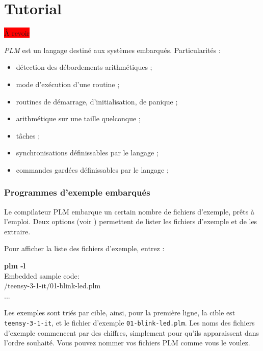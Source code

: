 

\chapter{Tutorial}

\thispagestyle{empty}

\colorbox{red}{À revoir}


\emph{PLM} est un langage destiné aux systèmes embarqués. Particularités :
\begin{itemize}
  \item détection des débordements arithmétiques ;
  \item mode d'exécution d'une routine ;
  \item routines de démarrage, d'initialisation, de panique ;
  \item arithmétique sur une taille quelconque ;
  \item tâches ;
  \item synchronisations définissables par le langage ;
  \item commandes gardées définissables par le langage ;
\end{itemize}



\subsection{Programmes d'exemple embarqués}

Le compilateur PLM embarque un certain nombre de fichiers d'exemple, prêts à l'emploi. Deux options (voir ) permettent de lister les fichiers d'exemple et de les extraire.

Pour afficher la liste des fichiers d'exemple, entrez :

\begin{SHELL}
{\bfseries plm -l}\\
Embedded sample code:\\ 
\hspace*{1.2em}/teensy-3-1-it/01-blink-led.plm\\
\hspace*{1.2em}...
\end{SHELL}

Les exemples sont triés par cible, ainsi, pour la première ligne, la cible est \texttt{teensy-3-1-it}, et le fichier d'exemple \texttt{01-blink-led.plm}. Les noms des fichiers d'exemple commencent par des chiffres, simplement pour qu'ils apparaissent dans l'ordre souhaité. Vous pouvez nommer vos fichiers PLM comme vous le voulez.


